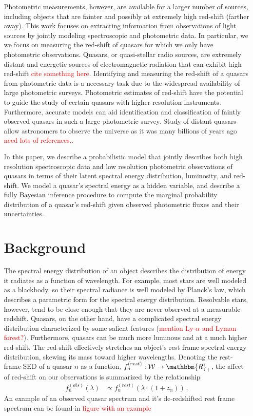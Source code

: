 \documentclass{article}
\newcommand{\R}{\mathbbm{R}}
\newcommand{\red}[1]{\textcolor{red}{#1}}
\begin{document}
Photometric measurements, however, are available for a larger number of sources, including objects that are fainter and possibly at extremely high red-shift (farther away).  This work focuses on extracting information from observations of light sources by jointly modeling spectroscopic and photometric data.  In particular, we we focus on measuring the red-shift of quasars for which we only have photometric observations.  Quasars, or quasi-stellar radio sources, are extremely distant and energetic sources of electromagnetic radiation that can exhibit high red-shift \red{cite something here}.  Identifying and measuring the red-shift of a quasars from photometric data is a necessary task due to the widespread availability of large photometric surveys.  Photometric estimates of red-shift have the potential to guide the study of certain quasars with higher resolution instruments.  Furthermore, accurate models can aid identification and classification of faintly observed quasars in such a large photometric survey.  Study of distant quasars allow astronomers to observe the universe as it was many billions of years ago \red{need lots of references..}

In this paper, we describe a probabilistic model that jointly describes both high resolution spectroscopic data and low resolution photometric observations of quasars in terms of their latent spectral energy distribution, luminosity, and red-shift.  We model a quasar's spectral energy as a hidden variable, and describe a fully Bayesian inference procedure to compute the marginal probability distribution of a quasar's red-shift given observed photometric fluxes and their uncertainties. 

\section{Background}
The spectral energy distribution of an object describes the distribution of energy it radiates as a function of wavelength.  
For example, most stars are well modeled as a blackbody, so their spectral radiance is well modeled by Planck's law, which describes a parametric form for the spectral energy distribution.  Resolvable stars, however, tend to be close enough that they are never observed at a measurable redshift. 
Quasars, on the other hand, have a complicated spectral energy distribution characterized by some salient features (\red{mention Ly-$\alpha$ and Lyman forest?}).  
Furthermore, quasars can be much more luminous and at a much higher red-shift.  
The red-shift effectively stretches an object's rest frame spectral energy distribution, skewing its mass toward higher wavelengths.  
Denoting the rest-frame SED of a quasar $n$ as a function, $f_n^{(rest)} : \mathcal{W} \rightarrow \R_+$, the affect of red-shift on our observations is summarized by the relationship 
\begin{align}
  f_n^{(obs)}(\lambda) &\propto f_n^{(rest)}(\lambda \cdot (1 + z_n)) \, .
\end{align}
An example of an observed quasar spectrum and it's de-redshifted rest frame spectrum can be found in \red{figure with an example}
\end{document}
